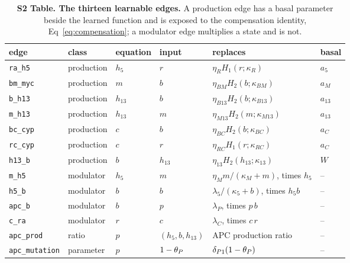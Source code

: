\begin{table}[h]
\centering\footnotesize
\caption{\textbf{S2 Table. The thirteen learnable edges.} A production edge has a
basal parameter beside the learned function and is exposed to the compensation
identity, Eq~\eqref{eq:compensation}; a modulator edge multiplies a state and is
not.}
\label{tab:edges}
\begin{tabular}{llllll}
\toprule
edge & class & equation & input & replaces & basal \\
\midrule
\texttt{ra\_h5} & production & $h_5$ & $r$ & $\eta_R H_1(r;\kappa_R)$ & $a_5$ \\
\texttt{bm\_myc} & production & $m$ & $b$ & $\eta_{BM}H_2(b;\kappa_{BM})$ & $a_M$ \\
\texttt{b\_h13} & production & $h_{13}$ & $b$ & $\eta_{B13}H_2(b;\kappa_{B13})$ & $a_{13}$ \\
\texttt{m\_h13} & production & $h_{13}$ & $m$ & $\eta_{M13}H_2(m;\kappa_{M13})$ & $a_{13}$ \\
\texttt{bc\_cyp} & production & $c$ & $b$ & $\eta_{BC}H_2(b;\kappa_{BC})$ & $a_C$ \\
\texttt{rc\_cyp} & production & $c$ & $r$ & $\eta_{RC}H_1(r;\kappa_{RC})$ & $a_C$ \\
\texttt{h13\_b} & production & $b$ & $h_{13}$ & $\eta_{13}H_2(h_{13};\kappa_{13})$ & $W$ \\
\texttt{m\_h5} & modulator & $h_5$ & $m$ & $\eta_M m/(\kappa_M+m)$, times $h_5$ & -- \\
\texttt{h5\_b} & modulator & $b$ & $b$ & $\lambda_5/(\kappa_5+b)$, times $h_5 b$ & -- \\
\texttt{apc\_b} & modulator & $b$ & $p$ & $\lambda_P$, times $p\,b$ & -- \\
\texttt{c\_ra} & modulator & $r$ & $c$ & $\lambda_C$, times $c\,r$ & -- \\
\texttt{apc\_prod} & ratio & $p$ & $(h_5,b,h_{13})$ & APC production ratio & -- \\
\texttt{apc\_mutation} & parameter & $p$ & $1-\theta_P$ & $\delta_{P1}(1-\theta_P)$ & -- \\
\bottomrule
\end{tabular}
\end{table}


